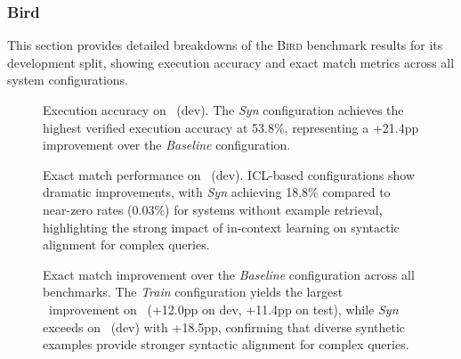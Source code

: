 \subsubsection{Bird}\label{sec:appendix:benchmark-results-bird}

This section provides detailed breakdowns of the \textsc{Bird} benchmark results
for its development split, showing execution accuracy and exact match metrics
across all system configurations.

\begin{figure}[htbp]
  \centering
  
  \caption{
    Execution accuracy on \Bird~(dev). The \textit{Syn} configuration achieves
    the highest verified execution accuracy at 53.8\%, representing a +21.4pp
    improvement over the \textit{Baseline} configuration.
  }
  \label{fig:appendix:bird-dev-ea}
\end{figure}

\begin{figure}[htbp]
  \centering
  
  \caption{
    Exact match performance on \Bird~(dev). ICL-based configurations show
    dramatic improvements, with \textit{Syn} achieving 18.8\% compared to
    near-zero rates (0.03\%) for systems without example retrieval, highlighting
    the strong impact of in-context learning on syntactic alignment for complex
    queries.
  }
  \label{fig:appendix:bird-dev-em}
\end{figure}

\begin{figure}[htbp]
  \centering
  
  \caption{
    Exact match improvement over the \textit{Baseline} configuration across all
    benchmarks. The \textit{Train} configuration yields the largest
    \EM~improvement on \Spider~(+12.0pp on dev, +11.4pp on test), while
    \textit{Syn} exceeds on \Bird~(dev) with +18.5pp, confirming that diverse
    synthetic examples provide stronger syntactic alignment for complex queries.
  }
  \label{fig:appendix:baseline-improvement-em}
\end{figure}
